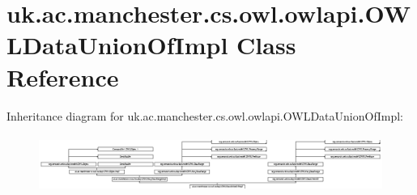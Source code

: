 \hypertarget{classuk_1_1ac_1_1manchester_1_1cs_1_1owl_1_1owlapi_1_1_o_w_l_data_union_of_impl}{\section{uk.\-ac.\-manchester.\-cs.\-owl.\-owlapi.\-O\-W\-L\-Data\-Union\-Of\-Impl Class Reference}
\label{classuk_1_1ac_1_1manchester_1_1cs_1_1owl_1_1owlapi_1_1_o_w_l_data_union_of_impl}
}
Inheritance diagram for uk.\-ac.\-manchester.\-cs.\-owl.\-owlapi.\-O\-W\-L\-Data\-Union\-Of\-Impl\-:\begin{figure}[H]
\begin{center}
\leavevmode
\includegraphics[height=1.899225cm]{classuk_1_1ac_1_1manchester_1_1cs_1_1owl_1_1owlapi_1_1_o_w_l_data_union_of_impl}
\end{center}
\end{figure}
